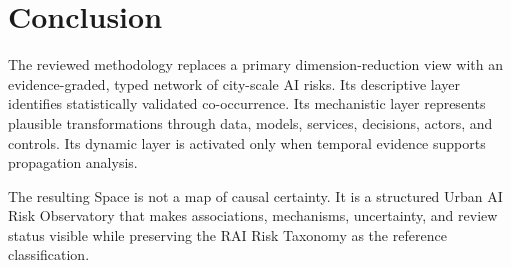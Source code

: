 \documentclass[11pt,a4paper]{article}
\begin{document}
\section{Conclusion}

The reviewed methodology replaces a primary dimension-reduction view with an evidence-graded, typed network of city-scale AI risks. Its descriptive layer identifies statistically validated co-occurrence. Its mechanistic layer represents plausible transformations through data, models, services, decisions, actors, and controls. Its dynamic layer is activated only when temporal evidence supports propagation analysis.

The resulting Space is not a map of causal certainty. It is a structured Urban AI Risk Observatory that makes associations, mechanisms, uncertainty, and review status visible while preserving the RAI Risk Taxonomy as the reference classification.
\end{document}
